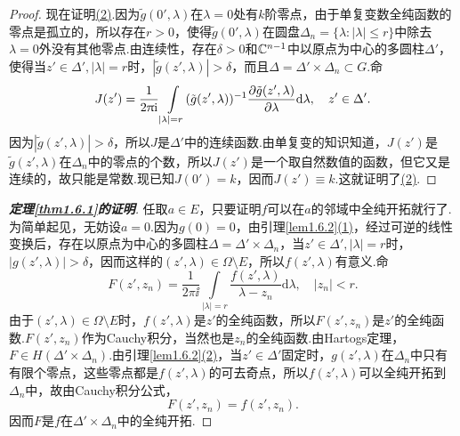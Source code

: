 \begin{lemma}
\begin{proof}
	现在证明\hyperlink{1.6.2}{(2)}.因为$\tilde{g}(0',\lambda)$在$\lambda=0$处有$k$阶零点，由于单复变数全纯函数的零点是孤立的，所以存在$r>0$，使得$\tilde{g}(0',\lambda)$在圆盘$\Delta_n=\{\lambda\colon|\lambda|\le r\}$中除去$\lambda=0$外没有其他零点.由连续性，存在$\delta>0$和$\mathbb C^{n-1}$中以原点为中心的多圆柱$\Delta'$，使得当$z'\in\Delta',|\lambda|=r$时，$|\tilde{g}(z',\lambda)|>\delta$，而且$\Delta=\Delta'\times\Delta_n\subset G$.命
	\[J(z')=\frac1{2\uppi\mathrm i}\int\limits_{|\lambda|=r}(\tilde{g}(z',\lambda))^{-1} \frac{\partial \tilde{g}(z',\lambda)}{\partial \lambda}\mathrm{d}\lambda,\quad z'\in\Delta' .\]
	因为$|\tilde{g}(z',\lambda)|>\delta$，所以$J$是$\Delta'$中的连续函数.由单复变的知识知道，$J(z')$是$\tilde{g}(z',\lambda)$在$\Delta_n$中的零点的个数，所以$J(z')$是一个取自然数值的函数，但它又是连续的，故只能是常数.现已知$J(0')=k$，因而$J(z')\equiv k$.这就证明了\hyperlink{1.6.2}{(2)}.
	\end{proof}
\begin{proof}[\textbf{定理\ref{thm1.6.1}的证明}]
	任取$a\in E$，只要证明$f$可以在$a$的邻域中全纯开拓就行了.为简单起见，无妨设$a=0$.因为$g(0)=0$，由引理\ref{lem1.6.2}\hyperlink{1.6.2}{(1)}，经过可逆的线性变换后，存在以原点为中心的多圆柱$\Delta=\Delta'\times\Delta_n$，当$z'\in\Delta',|\lambda|=r$时，$|g(z',\lambda)|>\delta$，因而这样的$(z',\lambda)\in\Omega\setminus E$，所以$f(z',\lambda)$有意义.命
	\[F(z',z_n)=\frac1{2\pi\ii}\int\limits_{|\lambda|=r} \frac{f(z',\lambda)}{\lambda-z_n}\mathrm{d}\lambda,\quad |z_n|<r.\]
	由于$(z',\lambda)\in\Omega\setminus E$时，$f(z',\lambda)$是$z'$的全纯函数，所以$F(z',z_n)$是$z'$的全纯函数.$F(z',z_n)$作为Cauchy积分，当然也是$z_n$的全纯函数.由Hartogs定理，$F\in H(\Delta'\times\Delta_n)$.由引理\ref{lem1.6.2}\hyperlink{1.6.2}{(2)}，当$z'\in\Delta'$固定时，$g(z',\lambda)$在$\Delta_n$中只有有限个零点，这些零点都是$f(z',\lambda)$的可去奇点，所以$f(z',\lambda)$可以全纯开拓到$\Delta_n$中，故由Cauchy积分公式，
	\[F(z',z_n)=f(z',z_n).\]
	因而$F$是$f$在$\Delta'\times\Delta_n$中的全纯开拓.
\end{proof}
\end{lemma}
